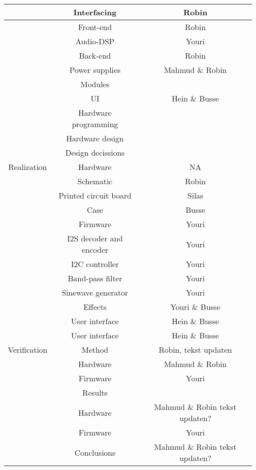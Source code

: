 \begin{justify}
\begin{longtable}{|c|c|c|}
								& Interfacing					& Robin				\\ \hline
								& Front-end						& Robin				\\ \hline
								& Audio-DSP						& Youri				\\ \hline
								& Back-end						& Robin				\\ \hline
								& Power supplies				& Mahmud \& Robin	\\ \hline
								& Modules						& 					\\ \hline
								& UI							& Hein \& Busse		\\ \hline
								& Hardware programming			& 					\\ \hline
								& Hardware design				& 					\\ \hline
								& Design decissions				& 					\\ \hline
	Realization					& Hardware						& NA				\\ \hline
								& Schematic						& Robin				\\ \hline
								& Printed circuit board			& Silas				\\ \hline
								& Case							& Busse				\\ \hline
								& Firmware						& Youri				\\ \hline
								& I2S decoder and encoder		& Youri				\\ \hline
								& I2C controller				& Youri				\\ \hline
								& Band-pass filter				& Youri				\\ \hline
								& Sinewave generator			& Youri				\\ \hline
								& Effects						& Youri \& Busse	\\ \hline
								& User interface				& Hein \& Busse		\\ \hline
								& User interface				& Hein \& Busse		\\ \hline
	Verification				& Method						& Robin, tekst updaten					\\ \hline
								& Hardware						& Mahmud \& Robin	\\ \hline
								& Firmware						& Youri				\\ \hline
								& Results						& 					\\ \hline
								& Hardware						& Mahmud \& Robin tekst updaten?					\\ \hline
								& Firmware						& Youri					\\ \hline
								& Conclusions					& Mahmud \& Robin tekst updaten?					\\ \hline

\end{longtable}
\end{justify}
